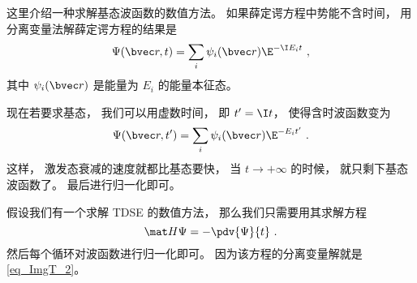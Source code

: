 
\begin{issues}
\issueDraft
\end{issues}

这里介绍一种求解基态波函数的数值方法。 如果薛定谔方程中势能不含时间， 用分离变量法解薛定谔方程的结果是
\begin{equation}
\Psi(\bvec r, t) = \sum_i \psi_i(\bvec r) \E^{-\I E_i t}~,
\end{equation}
其中 $\psi_i(\bvec r)$ 是能量为 $E_i$ 的能量本征态。

现在若要求基态， 我们可以用虚数时间， 即 $t' = \I t$， 使得含时波函数变为
\begin{equation}\label{eq_ImgT_2}
\Psi(\bvec r, t') = \sum_i \psi_i(\bvec r) \E^{- E_i t'}~.
\end{equation}
这样， 激发态衰减的速度就都比基态要快， 当 $t \to +\infty$ 的时候， 就只剩下基态波函数了。 最后进行归一化即可。

假设我们有一个求解 TDSE 的数值方法， 那么我们只需要用其求解方程
\begin{equation}
\mat H\Psi = -\pdv{\Psi}{t}~.
\end{equation}
然后每个循环对波函数进行归一化即可。 因为该方程的分离变量解就是\autoref{eq_ImgT_2}。
